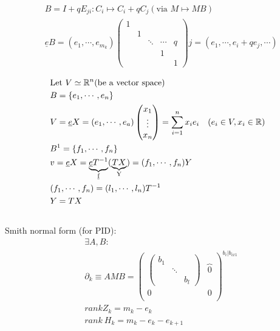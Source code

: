 \documentclass[11pt,a4paper]{report}
\begin{document}
              \begin{align*}
                &B = I + qE_{ji}: C_i \mapsto C_i + qC_j (\textrm{via } M \mapsto MB)\\
                &\underline{e}B = (e_1, \cdots, e_{m_{k}})\begin{pmatrix}1 &&&& \\ & 1 &&& \\ && \ddots & \cdots & q\\ &&& 1 &\\ &&&& 1\end{pmatrix}j = (e_1, \cdots, e_i + qe_j, \cdots)\\
              \end{align*}
              \begin{align*}
                &\textrm{Let } V \simeq \mathbb{\mathbb{R}}^n (\textrm{be a vector space})\\
                &B = \{e_1, \cdots, e_n\}\\
                &V = \underline{e}X = (e_1, \cdots, e_a)\begin{pmatrix}x_1\\\vdots\\x_n\end{pmatrix}= \sum_{i=1}^nx_ie_i \quad (e_i \in V, x_i \in \mathbb{R})\\
                &B^1 = \{f_1, \cdots, f_n\}\\
                &v = \underline{e}X = \underbrace{\underline{e} T^{-1}}_\text{\underline{f}}(\underbrace{TX}_\text{Y})= (f_1, \cdots, f_n) Y\\
                &(f_1, \cdots, f_n) = (l_1, \cdots, l_n) T^{-1}\\
                &Y = TX \\
                \end{align*}
              \\
              Smith normal form (for PID):
              \begin{align*}
                &\exists A, B:\\
                &\partial_k \equiv AMB = \left(\begin{array}{c|c}
                               \begin{pmatrix}b_1 && \\ & \ddots & \\ && b_l\end{pmatrix}& \overbrace{0}^\text{}\\
                               \hline
                               0 & 0 \\
                             \end{array}\right)^{b_{i} | b_{ix1}}
                \\
                &rank Z_k = m_k - e_k\\
                &rank\ H_k = m_k - e_k - e_{k+1}
              \end{align*}
              \\
              
\end{document}
